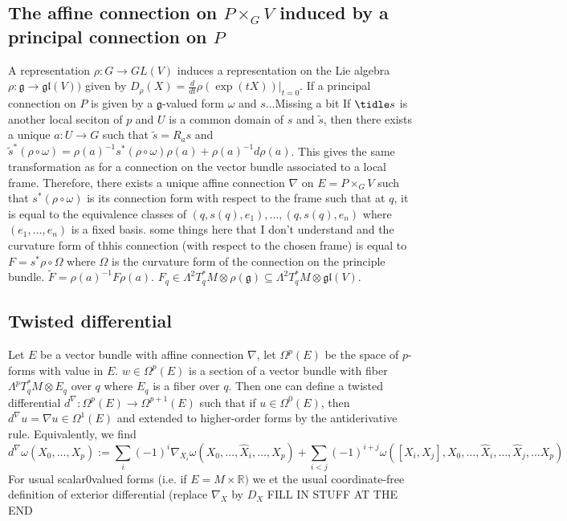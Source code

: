\documentclass{article}
\newcommand{\R}{\mathbb R}
\newcommand{\nl}{\newline\newline\noindent}
\newcommand{\w}{\omega}
\begin{document}
\subsection{The affine connection on $P\times_G V$ induced by a principal connection on $P$}
A representation $\rho: G\to GL(V)$ induces a representation on the Lie algebra $\rho: \mathfrak{g}\to \mathfrak{gl}(V))$ given by $D_\rho(X) = \frac{d}{dt}\rho(\exp(tX))\big|_{t=0}$. If a principal connection on $P$ is given by a $\mathfrak{g}$-valued form $\w$ and $s$...Missing a bit
\nl
If $\tidle s$ is another local seciton of $p$ and $U$ is a common domain of $s$ and $\tilde s$, then there exists a unique $a:U\to G$ such that $\tilde s = R_a s$ and $\tilde s^*(\rho\circ \w) = \rho(a)^{-1}s^*(\rho\circ\w)\rho(a)+ \rho(a)^{-1}d\rho(a)$. This gives the same transformation as for a connection on the vector bundle associated to a local frame.
\nl
Therefore, there exists a unique affine connection $\nabla$ on $E = P\times_G V$ such that $s^*(\rho\circ \w)$ is its connection form with respect to the frame such that at $q$, it is equal to the equivalence classes of $(q,s(q),e_1),\dots,(q,s(q),e_n)$ where $(e_1,\dots, e_n)$ is a fixed basis.
\nl
some things here that I don't understand
\nl
and the curvature form of thhis connection (with respect to the chosen frame) is equal to $F= s^*\rho\circ \Omega$ where $\Omega$ is the curvature form of the connection on the principle bundle. $\tilde F = \rho(a)^{-1}F\rho(a)$.
\nl
$F_q\in \Lambda^2T_q^*M\otimes \rho(\mathfrak g)\subseteq \Lambda^2T_q^*M\otimes \mathfrak{gl}(V)$.
\subsection{Twisted differential}
Let $E$ be a vector bundle with affine connection $\nabla$, let $\Omega^p(E)$ be the space of $p$-forms with value in $E$. $w\in \Omega^p(E)$ is a section of a vector bundle with fiber $\Lambda^pT_q^*M\otimes E_q$ over $q$ where $E_q$ is a fiber over $q$. Then one can define a twisted differential $d^\nabla:\Omega^p(E)\to \Omega^{p+1}(E)$  such that if $u\in \Omega^0(E)$, then $d^\nabla u = \nabla u\in \Omega^1(E)$ and extended to higher-order forms by the antiderivative rule. Equivalently, we find
\[d^\nabla\w(X_0,\dots, X_p):=\sum_i (-1)^i\nabla_{X_i}\w(X_0,\dots,\hat{X}_i, \dots, X_p) + \sum_{i<j}(-1)^{i+j}\w([X_i,X_j],X_0,\dots, \hat{X}_i,\dots, \hat X_j,\dots X_p)\]
For usual scalar0valued forms (i.e. if $E = M\times \R)$ we et the usual coordinate-free definition of exterior differential (replace $\nabla_X$ by $D_X$
FILL IN STUFF AT THE END
\end{document}
